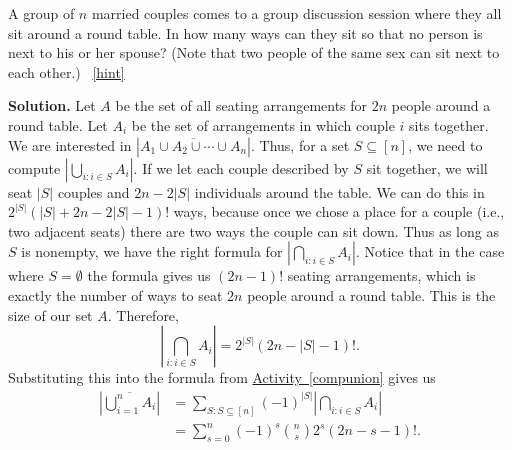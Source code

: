 \documentclass{book}
\begin{document}
\setcounter{project}{226}
\addtocounter{project}{-1}
\begin{activity}[]\label{relaxedmenage}
\hypertarget{p-1275}{}%
A group of \(n\) married couples comes to a group discussion session where they all sit around a round table. In how many ways can they sit so that no person is next to his or her spouse? (Note that two people of the same sex can sit next to each other.)%
~\hfill{\tiny\hyperlink{a-226}{[hint]}\hypertarget{q-226}{}}\par\smallskip%
\noindent\textbf{Solution.}\hypertarget{solution-162}{}\quad%
\hypertarget{p-1278}{}%
Let \(A\) be the set of all seating arrangements for \(2n\) people around a round table. Let \(A_i\) be the set of arrangements in which couple \(i\) sits together. We are interested in \(|\overline{A_1\cup A_2\cup \cdots \cup A_n}|\). Thus, for a set \(S\subseteq [n]\), we need to compute \(\left|\bigcup_{i\colon i\in S} A_i\right|\). If we let each couple described by \(S\) sit together, we will seat \(|S|\) couples and \(2n-2|S|\) individuals around the table. We can do this in \(2^{|S|}(|S| + 2n-2 |S|-1)!\) ways, because once we chose a place for a couple (i.e.\@, two adjacent seats) there are two ways the couple can sit down. Thus as long as \(S\) is nonempty, we have the right formula for \(\left|\bigcap_{i\colon i\in S} A_i\right|\). Notice that in the case where \(S=\emptyset\) the formula gives us \((2n-1)!\) seating arrangements, which is exactly the number of ways to seat \(2n\) people around a round table. This is the size of our set \(A\). Therefore,%
\begin{equation*}
\left|\bigcap_{i\colon i\in S} A_i\right| = 2^{|S|}(2n-|S|-1)!\text{.}
\end{equation*}
Substituting this into the formula from \hyperref[compunion]{Activity~\ref{compunion}} gives us%
\begin{align*}
\left|\overline{\bigcup_{i=1}^n A_i}\right| &=  \sum_{S:S\subseteq [n]}
(-1)^{|S|} \left|\bigcap_{i\colon i\in S} A_i\right|\\
&= \sum_{s=0}^n(-1)^s\binom{n}{s}2^{s}(2n- s-1)!\text{.}
\end{align*}
%
\end{activity}
\end{document}
